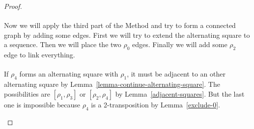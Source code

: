 \begin{proof}
\begin{figure}[H]
\begin{center}
\begin{tikzpicture}[scale=.8]
    \end{tikzpicture}
    \caption{}
    \label{proof-5-2}
  \end{center}
\end{figure}

\paragraph{}
Now we will apply the third part of the Method and try to form a connected graph by adding some edges. First we will try to extend the alternating square to a sequence. Then we will place the two $\rho_0$ edges. Finally we will add some $\rho_2$ edge to link everything.

\paragraph{}
If $\rho_4$ forms an alternating square with $\rho_1$, it must be adjacent to an other alternating square by Lemma~\ref{lemma-continue-alternating-square}. The possibilities are $[\rho_1, \rho_3]$ or $[\rho_2, \rho_4]$ by Lemma~\ref{adjacent-squares}. But the last one is impossible because $\rho_4$ is a 2-transposition by Lemma~\ref{exclude-0}.

\begin{figure}[H]
  \begin{center}
\end{center}
\end{figure}
\end{proof}
